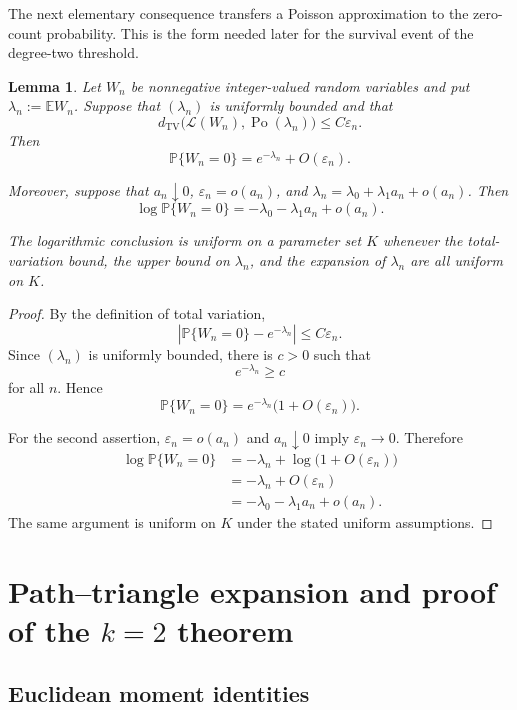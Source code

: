 \documentclass[11pt]{article}
\newtheorem{lemma}[theorem]{Lemma}
\theoremstyle{remark}
\newcommand{\E}{\mathbb E}
\newcommand{\Pp}{\mathbb P}
\newcommand{\eps}{\varepsilon}
\numberwithin{equation}{section}
\begin{document}
The next elementary consequence transfers a Poisson approximation to the
zero-count probability.  This is the form needed later for the survival
event of the degree-two threshold.

\begin{lemma}
\label{lem:zero-transfer}
Let \(W_n\) be nonnegative integer-valued random variables and put
$\lambda_n:=\E W_n$.
Suppose that \((\lambda_n)\) is uniformly bounded and that
\[
d_{\mathrm{TV}}
\bigl(
\mathcal L(W_n),
\operatorname{Po}(\lambda_n)
\bigr)
\le
C\eps_n.
\]
Then
\[
\Pp\{W_n=0\}
=
e^{-\lambda_n}
+
O(\eps_n).
\]

Moreover, suppose that
$a_n\downarrow0$,
$\eps_n=o(a_n)$,
and
$\lambda_n
=
\lambda_0+\lambda_1a_n+o(a_n)$.
Then
\[
\log\Pp\{W_n=0\}
=
-\lambda_0-\lambda_1a_n+o(a_n).
\]

The logarithmic conclusion is uniform on a parameter set \(K\) whenever
the total-variation bound, the upper bound on \(\lambda_n\), and the
expansion of \(\lambda_n\) are all uniform on \(K\).
\end{lemma}

\begin{proof}
By the definition of total variation,
\[
\left|
\Pp\{W_n=0\}
-
e^{-\lambda_n}
\right|
\le
C\eps_n.
\]
Since \((\lambda_n)\) is uniformly bounded, there is \(c>0\) such that
\[
e^{-\lambda_n}\ge c
\]
for all \(n\).  Hence
\[
\Pp\{W_n=0\}
=
e^{-\lambda_n}
\bigl(1+O(\eps_n)\bigr).
\]

For the second assertion,
$\eps_n=o(a_n)$ and $a_n\downarrow0$
imply \(\eps_n\to0\).  Therefore
\[
\begin{aligned}
\log\Pp\{W_n=0\}
&=
-\lambda_n
+
\log\bigl(1+O(\eps_n)\bigr)\\
&=
-\lambda_n+O(\eps_n)\\
&=
-\lambda_0-\lambda_1a_n+o(a_n).
\end{aligned}
\]
The same argument is uniform on \(K\) under the stated uniform
assumptions.
\end{proof}

\section{Path--triangle expansion and proof of the \texorpdfstring{$k=2$}{k=2} theorem}
\label{sec:k2}

\subsection{Euclidean moment identities}
\end{document}
